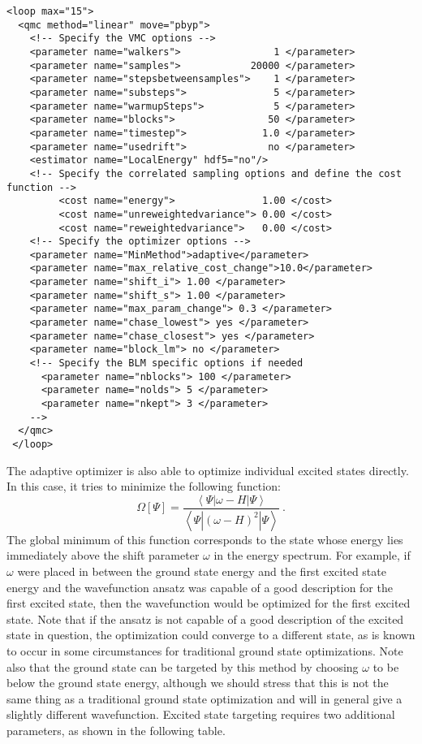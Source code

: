 \begin{lstlisting}[style=QMCPXML]
 <loop max="15">
  <qmc method="linear" move="pbyp">
    <!-- Specify the VMC options -->
    <parameter name="walkers">                1 </parameter>
    <parameter name="samples">            20000 </parameter>
    <parameter name="stepsbetweensamples">    1 </parameter>
    <parameter name="substeps">               5 </parameter>
    <parameter name="warmupSteps">            5 </parameter>
    <parameter name="blocks">                50 </parameter>
    <parameter name="timestep">             1.0 </parameter>
    <parameter name="usedrift">              no </parameter>
    <estimator name="LocalEnergy" hdf5="no"/>
    <!-- Specify the correlated sampling options and define the cost function -->
         <cost name="energy">               1.00 </cost>
         <cost name="unreweightedvariance"> 0.00 </cost>
         <cost name="reweightedvariance">   0.00 </cost>
    <!-- Specify the optimizer options -->
    <parameter name="MinMethod">adaptive</parameter>
    <parameter name="max_relative_cost_change">10.0</parameter>
    <parameter name="shift_i"> 1.00 </parameter>
    <parameter name="shift_s"> 1.00 </parameter>
    <parameter name="max_param_change"> 0.3 </parameter>
    <parameter name="chase_lowest"> yes </parameter>
    <parameter name="chase_closest"> yes </parameter>
    <parameter name="block_lm"> no </parameter>
    <!-- Specify the BLM specific options if needed
      <parameter name="nblocks"> 100 </parameter>
      <parameter name="nolds"> 5 </parameter>
      <parameter name="nkept"> 3 </parameter>
    -->
  </qmc>
 </loop>
\end{lstlisting}

The adaptive optimizer is also able to optimize individual excited states directly. \cite{Zhao:2016:dir_tar}
In this case, it tries to minimize the following function: 
\begin{equation*}
\Omega[\Psi]=\frac{\left<\Psi|\omega-H|\Psi\right>}{\left<\Psi|{\left(\omega-H\right)}^2|\Psi\right>}\:.
\end{equation*}
The global minimum of this function corresponds to the state whose energy lies immediately above the shift parameter $\omega$ in the energy spectrum.
For example, if $\omega$ were placed in between the ground state energy and the first excited state energy and the wavefunction ansatz was capable of a good
description for the first excited state, then the wavefunction would be optimized for the first excited state.
Note that if the ansatz is not capable of a good description of the excited state in question, the optimization could converge to a different
state, as is known to occur in some circumstances for traditional ground state optimizations.
Note also that the ground state can be targeted by this method by choosing $\omega$ to be below the ground state energy, although we should stress that this
is not the same thing as a traditional ground state optimization and will in general give a slightly different wavefunction.
Excited state targeting requires two additional parameters, as shown in the following table.\\

